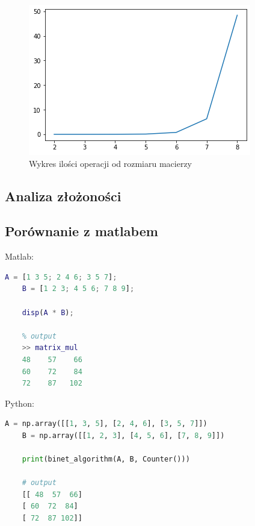 \documentclass[12pt,a4paper,table]{article}
\begin{document}
    \begin{figure}[H]
        \centering
        \includegraphics[width=0.6\linewidth]{img/binet_times.png}
        \caption{Wykres ilości operacji od rozmiaru macierzy}
        \label{fig:binet_flops}
    \end{figure}

    \subsection{Analiza złożoności}


    \subsection{Porównanie z matlabem}
    Matlab:
    \begin{lstlisting}[language=Matlab]
    A = [1 3 5; 2 4 6; 3 5 7];
    B = [1 2 3; 4 5 6; 7 8 9];

    disp(A * B);

    % output
    >> matrix_mul
    48    57    66
    60    72    84
    72    87   102
    \end{lstlisting}
    Python:
    \begin{lstlisting}[language=Python]
    A = np.array([[1, 3, 5], [2, 4, 6], [3, 5, 7]])
    B = np.array([[1, 2, 3], [4, 5, 6], [7, 8, 9]])

    print(binet_algorithm(A, B, Counter()))

    # output
    [[ 48  57  66]
    [ 60  72  84]
    [ 72  87 102]]
    \end{lstlisting}
        
\end{document}

